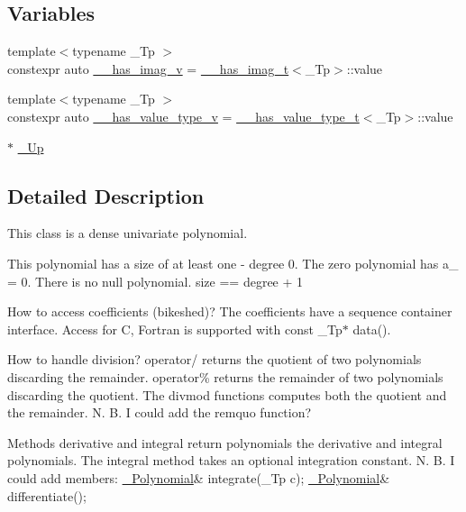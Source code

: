 \subsection*{Variables}
\begin{DoxyCompactItemize}
\item 
{\footnotesize template$<$typename \+\_\+\+Tp $>$ }\\constexpr auto \hyperlink{namespace____gnu__cxx_afa2404a914b06f950f3a46e75aca51a9}{\+\_\+\+\_\+has\+\_\+imag\+\_\+v} = \hyperlink{struct____gnu__cxx_1_1____has__imag__t}{\+\_\+\+\_\+has\+\_\+imag\+\_\+t}$<$\+\_\+\+Tp$>$\+::value
\item 
{\footnotesize template$<$typename \+\_\+\+Tp $>$ }\\constexpr auto \hyperlink{namespace____gnu__cxx_a5ec7bbecf1d944f8aa448f873584cf98}{\+\_\+\+\_\+has\+\_\+value\+\_\+type\+\_\+v} = \hyperlink{struct____gnu__cxx_1_1____has__value__type__t}{\+\_\+\+\_\+has\+\_\+value\+\_\+type\+\_\+t}$<$\+\_\+\+Tp$>$\+::value
\item 
$\ast$ \hyperlink{namespace____gnu__cxx_ab693ea357b6429b331e0bf09f9442385}{\+\_\+\+Up}
\end{DoxyCompactItemize}


\subsection{Detailed Description}
This class is a dense univariate polynomial.

This polynomial has a size of at least one -\/ degree 0. The zero polynomial has a\+\_ = 0. There is no null polynomial. size == degree + 1

How to access coefficients (bikeshed)? The coefficients have a sequence container interface. Access for C, Fortran is supported with const \+\_\+\+Tp$\ast$ data().

How to handle division? operator/ returns the quotient of two polynomials discarding the remainder. operator\% returns the remainder of two polynomials discarding the quotient. The divmod functions computes both the quotient and the remainder. N. B. I could add the remquo function?

Methods derivative and integral return polynomials the derivative and integral polynomials. The integral method takes an optional integration constant. N. B. I could add members\+: \hyperlink{class____gnu__cxx_1_1__Polynomial}{\+\_\+\+Polynomial}\& integrate(\+\_\+\+Tp c); \hyperlink{class____gnu__cxx_1_1__Polynomial}{\+\_\+\+Polynomial}\& differentiate();


